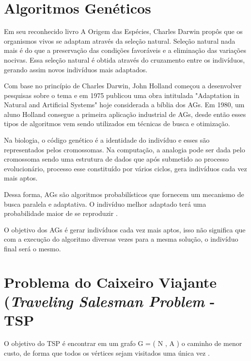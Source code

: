 \documentclass[final,5p,times,twocolumn]{elsarticle}
\begin{document}
	
	
\section {Algoritmos Genéticos}

	Em seu reconhecido livro A Origem das Espécies, Charles Darwin propôs que os organismos vivos se adaptam através 
	da seleção natural. Seleção natural nada mais é do que a preservação das condições favoráveis e a eliminação das 
	variações nocivas. Essa seleção natural é obtida através do cruzamento entre os indivíduos, gerando assim novos
 	indivíduos mais adaptados.

	Com base no princípio de Charles Darwin, John Holland começou a desenvolver pesquisas sobre o tema e em 1975 
	publicou uma obra intitulada "Adaptation in Natural and Artificial Systems" hoje considerada a bíblia dos AGs.
	Em 1980, um aluno Holland consegue a primeira aplicação industrial de AGs, desde então esses tipos de algoritmos vem 
	sendo utilizados em técnicas de busca e otimização.

	Na biologia, o código genético é a identidade do indivíduo e esses são representados pelos cromossomas. 
	Na computação, a analogia pode ser dada pelo cromossoma sendo uma estrutura de dados que após submetido 
	ao processo evolucionário, processo esse constituído por vários ciclos, gera indivíduos cada vez mais 
	aptos.

	Dessa forma, AGs são algoritmos probabilísticos que fornecem um mecanismo de busca paralela e adaptativa. O indivíduo melhor adaptado terá uma probabilidade maior de se reproduzir \cite{0004-pdf}.

	O objetivo dos AGs é gerar indivíduos cada vez mais aptos, isso não significa que com a execução do algoritmo 
	diversas vezes para a mesma solução, o indivíduo final será o mesmo.

\section {Problema do Caixeiro Viajante (\textit{Traveling Salesman Problem} - TSP}
	O objetivo do TSP é encontrar em um grafo G = ( N , A ) o caminho de menor custo, 
	de forma que todos os vértices sejam visitados uma única vez \cite{0006-pdf}.
	
\end{document}

